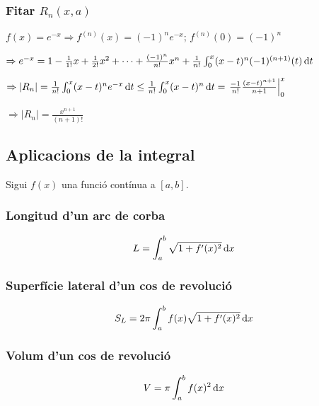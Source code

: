 \subsubsection*{Fitar $R_{n} (x,a)$}
\begin{example}
    $f(x) = e^{-x} \Rightarrow f^{(n)}(x) = (-1)^{n} e^{-x}$; $f^{(n)}(0) = (-1)^{n}$
    
    $\Rightarrow e^{-x} = 1 - \frac{1}{1!}x + \frac{1}{2!}x^{2} + \dots + \frac{(-1)^{n}}{n!}x^{n}+ \frac{1}{n!} \int_{0}^{x} (x-t)^{n} (-1)^{(n+1)}(t) \mathop{}\!\mathrm{d} t$
    
    $\Rightarrow |R_{n}| = \frac{1}{n!} \int_{0}^{x} (x-t)^{n} e^{-x} \mathop{}\!\mathrm{d} t \leq \frac{1}{n!} \int_{0}^{x} (x-t)^{n} \mathop{}\!\mathrm{d} t = \left. \frac{-1}{n!} \frac{(x-t)^{n+1}}{n+1} \right|_{0}^{x}$
    
    $\Rightarrow |R_{n}| = \frac{x^{n+1}}{(n+1)!}$
\end{example}

\subsection{Aplicacions de la integral}
Sigui $f(x)$ una funció contínua a $[a , b]$.

\subsubsection*{Longitud d'un arc de corba}
\begin{align}
    L = \int_{a}^{b} \sqrt{1 + f'(x)^{2}} \mathop{}\!\mathrm{d} x
\end{align}

\subsubsection*{Superfície lateral d'un cos de revolució}
\begin{align}
    S_{L} = 2 \pi \int_{a}^{b} f(x) \sqrt{1 + f'(x)^{2}}  \mathop{}\!\mathrm{d} x
\end{align}

\subsubsection*{Volum d'un cos de revolució}
\begin{align}
    V = \pi \int_{a}^{b} f(x)^{2} \mathop{}\!\mathrm{d} x
\end{align}
